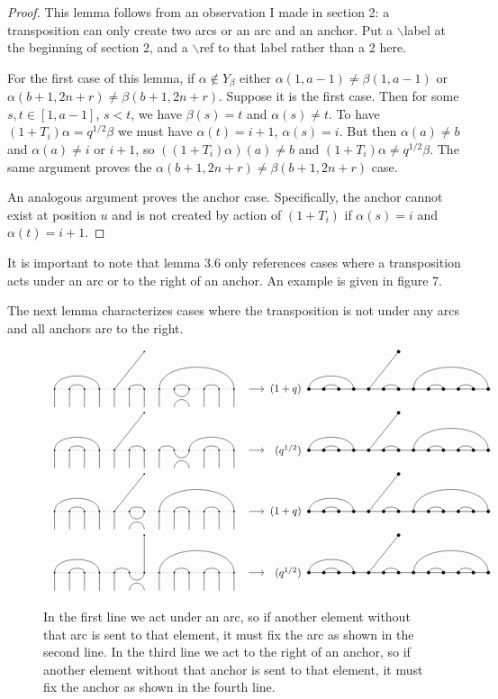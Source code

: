 \documentclass{amsart}
\begin{document}
\begin{proof}
	This lemma follows from an observation I made in section 2: a transposition can only create two arcs or an arc and an anchor. 
  {\color{magenta} Put a $\backslash$label at the beginning of section 2, and a $\backslash$ref to that label rather than a 2 here.}

	For the first case of this lemma, if $\alpha\not\in Y_\beta$ either $\alpha(1,a-1)\not=\beta(1,a-1)$ or $\alpha(b+1,2n+r)\not=\beta(b+1,2n+r)$. Suppose it is the first case. Then for some $s,t\in [1,a-1]$, $s<t$, we have $\beta(s)=t$ and $\alpha(s)\not=t$. To have $(1+T_i)\alpha=q^{1/2}\beta$ we must have $\alpha(t)=i+1$, $\alpha(s)=i$. But then $\alpha(a)\not=b$ and $\alpha(a)\not=i$ or $i+1$, so $((1+T_i)\alpha)(a)\not=b$ and $(1+T_i)\alpha\not=q^{1/2}\beta$. The same argument proves the $\alpha(b+1,2n+r)\not=\beta(b+1,2n+r)$ case. 
	
	An analogous argument proves the anchor case. Specifically, the anchor cannot exist at position $u$ and is not created by action of $(1+T_i)$ if $\alpha(s)=i$ and $\alpha(t)=i+1$.
	
\end{proof}

\vspace{5mm}
It is important to note that lemma 3.6 only references cases where a transposition acts under an arc or to the right of an anchor. An example is given in figure 7. 

The next lemma characterizes cases where the transposition is not under any arcs and all anchors are to the right.

\begin{figure}[b]
	\[
	\begin{tabular}{l l l l}
	\GeneralizedAction{13}{1/4,2/3,6/7,8/13,9/10,11/12}{1}{5/1}{5/4}{9}{1/4,2/3,6/7,8/13,9/10,11/12}{5/1}{(1+q)}\\
	
	\GeneralizedAction{13}{1/4,2/3,6/7,8/9,10/13,11/12}{1}{5/1}{5/4}{9}{1/4,2/3,6/7,8/13,9/10,11/12}{5/1}{(q^{1/2})}\\
	
	\GeneralizedAction{13}{1/4,2/3,6/7,8/13,9/10,11/12}{1}{5/1}{5/4}{6}{1/4,2/3,6/7,8/13,9/10,11/12}{5/1}{(1+q)}\\
	
	\GeneralizedAction{13}{1/4,2/3,5/6,8/13,9/10,11/12}{1}{7/1}{5/4}{6}{1/4,2/3,6/7,8/13,9/10,11/12}{5/1}{(q^{1/2})}\\
	
	\end{tabular}
	\]
	
	\caption{In the first line we act under an arc, so if another element without that arc is sent to that element, it must fix the arc as shown in the second line. In the third line we act to the right of an anchor, so if another element without that anchor is sent to that element, it must fix the anchor as shown in the fourth line. 
	}
\end{figure}
\end{document}
